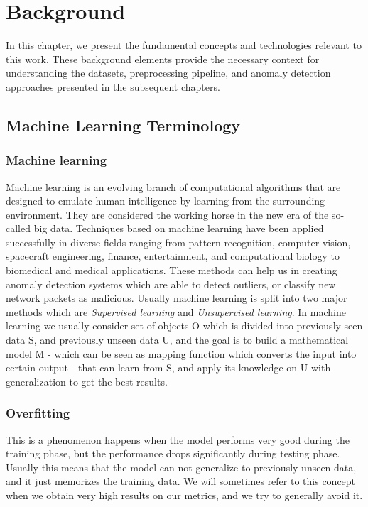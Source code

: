    \chapter{Background}
\label{chap:background}

In this chapter, we present the fundamental concepts and technologies relevant
to this work. These background elements provide the
necessary context for understanding the datasets, preprocessing
pipeline, and anomaly detection approaches presented in the
subsequent chapters.


\section{Machine Learning Terminology}
\subsection{Machine learning}
Machine learning is an evolving branch of computational algorithms that are designed to emulate human intelligence by learning from the surrounding environment. They are considered the working horse in the new era of the so-called big data. Techniques based on machine learning have been applied successfully in diverse fields ranging from pattern recognition, computer vision, spacecraft engineering, finance, entertainment, and computational biology to biomedical and medical applications. These methods can help us in creating anomaly detection systems which are able to detect outliers, or classify new network packets as malicious. Usually machine learning is split into two major methods which are \textit{Supervised learning} and \textit{Unsupervised learning}. In machine learning we usually consider set of objects O which is divided into previously seen data S, and previously unseen data U, and the goal is to build a mathematical model M - which can be seen as mapping function which converts the input into certain output - that can learn from S, and apply its knowledge on U with generalization to get the best results. 
\subsection{Overfitting}
This is a phenomenon happens when the model performs very good during the training phase, but the performance drops significantly during testing phase. Usually this means that the model can not generalize to previously unseen data, and it just memorizes the training data. We will sometimes refer to this concept when we obtain very high results on our metrics, and we try to generally avoid it.  

